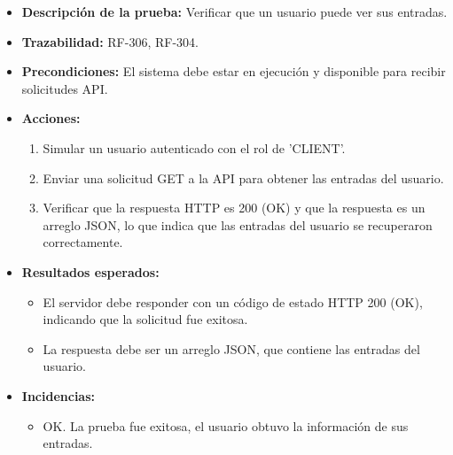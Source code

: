\begin{itemize}
    \item \textbf{Descripción de la prueba:} Verificar que un usuario puede ver sus entradas.
    \item \textbf{Trazabilidad:} RF-306, RF-304.
    \item \textbf{Precondiciones:} El sistema debe estar en ejecución y disponible para recibir solicitudes API.
    \item \textbf{Acciones:}
    \begin{enumerate}
        \item Simular un usuario autenticado con el rol de 'CLIENT'.
        \item Enviar una solicitud GET a la API para obtener las entradas del usuario.
        \item Verificar que la respuesta HTTP es 200 (OK) y que la respuesta es un arreglo JSON, lo que indica que las entradas del usuario se recuperaron correctamente.
    \end{enumerate}
    \item \textbf{Resultados esperados:}
    \begin{itemize}
        \item El servidor debe responder con un código de estado HTTP 200 (OK), indicando que la solicitud fue exitosa.
        \item La respuesta debe ser un arreglo JSON, que contiene las entradas del usuario.
    \end{itemize}
    \item \textbf{Incidencias:}
    \begin{itemize}
        \item OK. La prueba fue exitosa, el usuario obtuvo la información de sus entradas.
    \end{itemize}
\end{itemize}

